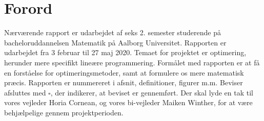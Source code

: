 \chapter{Forord}
Nærværende rapport er udarbejdet af seks 2. semester studerende på bacheloruddannelsen Matematik på Aalborg Universitet. 
Rapporten er udarbejdet fra 3 februar til 27 maj 2020.
% 
Temaet for projektet er optimering, herunder mere specifikt lineære programmering.
%
Formålet med rapporten er at få en forståelse for optimeringsmetoder, samt at formulere os mere matematisk præcis.
% 	
Rapporten er nummereret i afsnit, definitioner, figurer m.m.
Beviser afsluttes med $\square$, der indikerer, at beviset er gennemført.
%
Der skal lyde en tak til vores vejleder Horia Cornean, og vores bi-vejleder Maiken Winther, for at være behjælpelige gennem projektperioden.
%
\\\\
